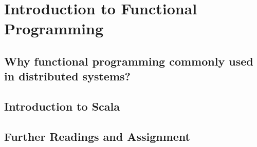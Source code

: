 \section{Introduction to Functional Programming}
\subsection{Why functional programming commonly used in distributed systems?}
\subsection{Introduction to Scala}
\subsection{Further Readings and Assignment}